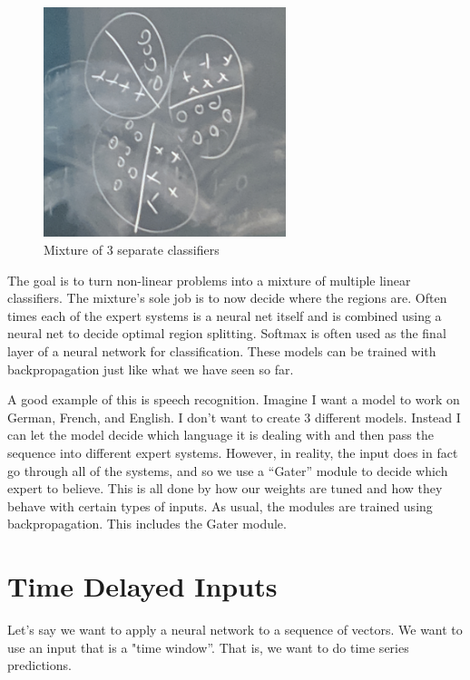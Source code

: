 \begin{figure}
    \centering
    \includegraphics[width=200pt]{lectures/03-a/images/mixture.png}
    \caption{Mixture of 3 separate classifiers}
    \label{fig:mixture}
\end{figure}

The goal is to turn non-linear problems into a mixture of multiple linear classifiers. 
The mixture's sole job is to now decide where the regions are. 
Often times each of the expert systems is a neural net itself and is combined using a neural net to decide optimal region splitting. 
Softmax is often used as the final layer of a neural network for classification. 
These models can be trained with backpropagation just like what we have seen so far. 

A good example of this is speech recognition. 
Imagine I want a model to work on German, French, and English. 
I don't want to create 3 different models. 
Instead I can let the model decide which language it is dealing with and then pass the sequence into different expert systems. 
However, in reality, the input does in fact go through all of the systems, and so we use a ``Gater'' module to decide which expert to believe. 
This is all done by how our weights are tuned and how they behave with certain types of inputs. 
As usual, the modules are trained using backpropagation. 
This includes the Gater module.

\section{Time Delayed Inputs}

Let's say we want to apply a neural network to a sequence of vectors. 
We want to use an input that is a "time window''. 
That is, we want to do time series predictions.


